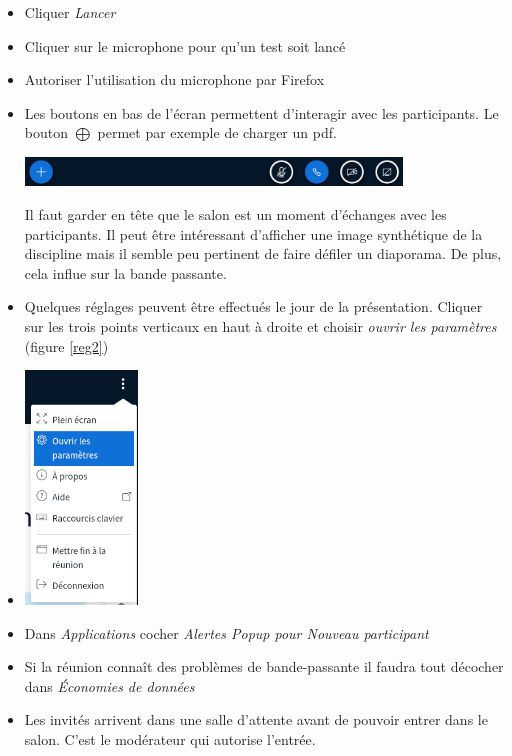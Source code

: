 \documentclass[a4paper,11pt]{article}
\begin{document}
\begin{itemize}
    \item Cliquer \emph{Lancer}
    \item Cliquer sur le microphone pour qu'un test soit lancé
    \item Autoriser l'utilisation du microphone par Firefox
    \item Les boutons en bas de l'écran permettent d'interagir avec les participants. Le bouton $\bigoplus$ permet par exemple de charger un pdf.
          \begin{center}
              \centering
              \includegraphics[width=10cm]{ressources/boutons.png}
              \label{interagir}
          \end{center}
          Il faut garder en tête que le salon est un moment d'échanges avec les participants. Il peut être intéressant d'afficher une image synthétique de la discipline mais il semble peu pertinent de faire défiler un diaporama. De plus, cela influe sur la bande passante.
    
    \item Quelques réglages peuvent être effectués le jour de la présentation. Cliquer sur les trois points verticaux en haut à droite et choisir \emph{ouvrir les paramètres} (figure \ref{reg2})
    \item \begin{center}
        \centering
        \includegraphics[width=3cm]{ressources/reglages2.png}
        \label{reg2}
    \end{center}
    
    \item Dans \emph{Applications} cocher \emph{Alertes Popup pour Nouveau participant}
    \item Si la réunion connaît des problèmes de bande-passante il faudra tout décocher dans \emph{Économies de données}
    \item Les invités arrivent dans une salle d'attente avant de pouvoir entrer dans le salon. C'est le modérateur qui autorise l'entrée.
\end{itemize}
\end{document}
